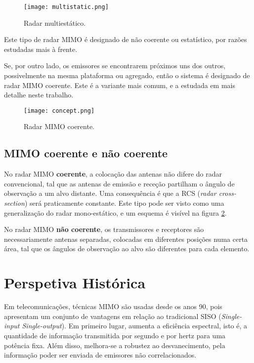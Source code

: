 \documentclass[purist,portuguese]{ist-report}
\begin{document}
\begin{figure}[h]
  \centering
  \texttt{[image: multistatic.png]}
  \caption{Radar multiestático.}
  \label{fig:multi}
\end{figure}

Este tipo de radar MIMO é designado de não coerente ou estatístico, por razões estudadas mais à frente.

Se, por outro lado, os emissores se encontrarem próximos uns dos outros, possivelmente na mesma plataforma ou agregado, então o sistema é designado de radar MIMO coerente.
Este é a variante mais comum, e a estudada em mais detalhe neste trabalho.

\begin{figure}[h]
  \centering
  \texttt{[image: concept.png]}
  \caption{Radar MIMO coerente.}
  \label{fig:concept}
\end{figure}

\subsection{MIMO coerente e não coerente}

No radar MIMO \textbf{coerente}, a colocação das antenas não difere do radar convencional, tal que as antenas de emissão e receção partilham o ângulo de observação a um alvo distante.
Uma consequência é que a RCS (\textit{radar cross-section}) será praticamente constante.
Este tipo pode ser visto como uma generalização do radar mono-estático, e um esquema é visível na figura \ref{fig:concept}.

No radar MIMO \textbf{não coerente}, os transmissores e receptores são necessariamente antenas separadas, colocadas em diferentes posições numa certa área, tal que os ângulos de observação ao alvo são diferentes para cada elemento.

\section{Perspetiva Histórica}

Em telecomunicações, técnicas MIMO são usadas desde os anos 90, pois apresentam um conjunto de vantagens em relação ao tradicional SISO (\textit{Single-input Single-output}).
Em primeiro lugar, aumenta a eficiência espectral, isto é, a quantidade de informação transmitida por segundo e por hertz para uma potência fixa. 
Além disso, melhora-se a robustez ao desvanecimento, pela informação poder ser enviada de emissores não correlacionados.
\end{document}
